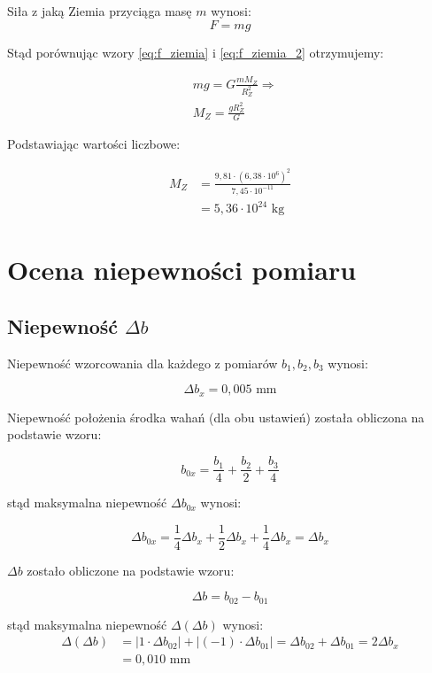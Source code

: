 \documentclass[a4paper,12pt]{article}
\begin{document}
Siła z jaką Ziemia przyciąga masę $m$ wynosi:
\begin{equation}
    \label{eq:f_ziemia_2}
    F = mg
\end{equation}

Stąd porównując wzory \eqref{eq:f_ziemia} i \eqref{eq:f_ziemia_2} otrzymujemy:

\begin{align*}
     & mg = G \frac{mM_Z}{R_Z^2} \Rightarrow \\
     & M_Z = \frac{gR_Z^2}{G}
\end{align*}

Podstawiając wartości liczbowe:

\begin{align*}
    M_Z & = \frac{9{,}81 \cdot (6{,}38 \cdot 10^6)^2}{7{,}45 \cdot 10^{-11}} \\
        & = 5{,}36 \cdot 10^{24} \text{ kg}
\end{align*}










\section{Ocena niepewności pomiaru}

\subsection{Niepewność $\Delta b$}

Niepewność wzorcowania dla każdego z pomiarów $b_1, b_2, b_3$ wynosi:

$$
    \Delta b_x = 0,005 \text{ mm}
$$

Niepewność położenia środka wahań (dla obu ustawień) została obliczona na podstawie wzoru:

$$
    b_{0x} = \frac{b_1}{4} + \frac{b_2}{2} + \frac{b_3}{4}
$$

stąd maksymalna niepewność $\Delta b_{0x}$ wynosi:

$$
    \Delta b_{0x} = \frac{1}{4}\Delta b_x + \frac{1}{2}\Delta b_x + \frac{1}{4}\Delta b_x = \Delta b_x
$$

$\Delta b$ zostało obliczone na podstawie wzoru:

$$
    \Delta b = b_{02} - b_{01}
$$

stąd maksymalna niepewność $\Delta(\Delta b)$ wynosi:
\begin{align*}
    \Delta(\Delta b) & = |1 \cdot \Delta b_{02}| + |(-1) \cdot \Delta b_{01}| = \Delta b_{02} + \Delta b_{01} = 2\Delta b_x \\
                     & = 0,010 \text{ mm}
\end{align*}
\end{document}

